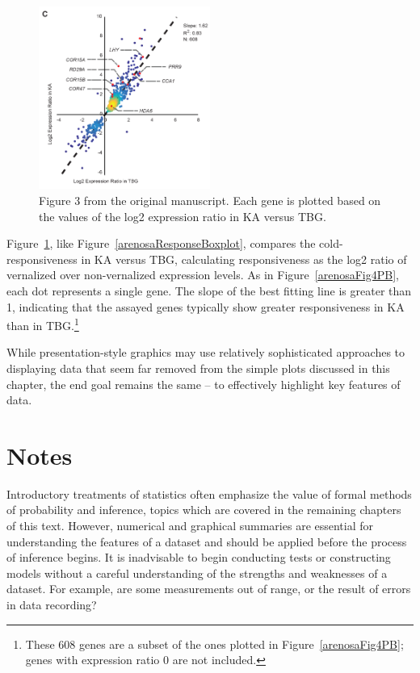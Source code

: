 \textD{\newpage}

\begin{figure}[h]
	\centering
	\includegraphics[width=0.5\textwidth]{ch_intro_to_data_oi_biostat/figures/arenosaVisFigs/Fig3_PB}
	\caption{Figure 3 from the original manuscript. Each gene is plotted based on the values of the log2 expression ratio in KA versus TBG.}
	\label{arenosaFig3PB}
\end{figure}

Figure~\ref{arenosaFig3PB}, like Figure~\ref{arenosaResponseBoxplot}, compares the cold-responsiveness in KA versus TBG, calculating responsiveness as the log2 ratio of vernalized over non-vernalized expression levels. As in Figure~\ref{arenosaFig4PB}, each dot represents a single gene. The slope of the best fitting line is greater than 1, indicating that the assayed genes typically show greater responsiveness in KA than in TBG.\footnote{These 608 genes are a subset of the ones plotted in Figure~\ref{arenosaFig4PB}; genes with expression ratio 0 are not included.}

While presentation-style graphics may use relatively sophisticated approaches to displaying data that seem far removed from the simple plots discussed in this chapter, the end goal remains the same -- to effectively highlight key features of data. 


\section{Notes}
\label{notesChapterData}

Introductory treatments of statistics often emphasize the value of formal methods of probability and inference, topics which are covered in the remaining chapters of this text. However, numerical and graphical summaries are essential for understanding the features of a dataset and should be applied before the process of inference begins. It is inadvisable to begin conducting tests or constructing models without a careful understanding of the strengths and weaknesses of a dataset. For example, are some measurements out of range, or the result of errors in data recording?

